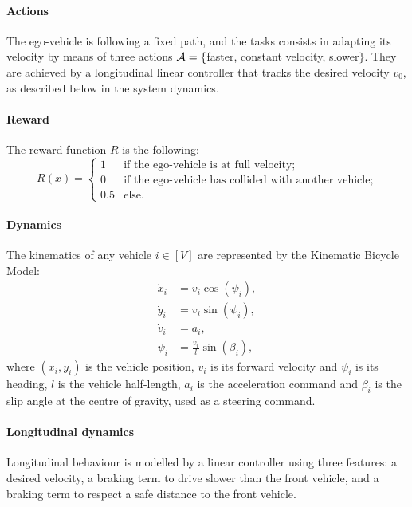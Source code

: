 \documentclass{article}
\begin{document}
\paragraph{Actions}

The ego-vehicle is following a fixed path, and the tasks consists in adapting its velocity by means of three actions $\mathcal{A} = \{$faster, constant velocity, slower$\}$. They are achieved by a longitudinal linear controller that tracks the desired velocity $v_0$, as described below in the system dynamics.

\paragraph{Reward}

The reward function $R$ is the following:
\[
R(x) = 
\begin{cases}
1 & \text{if the ego-vehicle is at full velocity;}\\
0 & \text{if the ego-vehicle has collided with another vehicle;}\\
0.5 & \text{else.}
\end{cases}\]

\paragraph{Dynamics}

The kinematics of any vehicle $i\in[V]$ are represented by the Kinematic Bicycle Model:
\begin{align}
\dot{x}_i &= v_i\cos(\psi_i), \nonumber\\
\dot{y}_i &= v_i\sin(\psi_i), \nonumber\\
\dot{v}_i &= a_i, \nonumber\\
\dot{\psi}_i &= \frac{v_i}{l}\sin(\beta_i), \nonumber
\end{align}
where $(x_i, y_i)$ is the vehicle position, $v_i$ is its forward velocity and $\psi_i$ is its heading, $l$ is the vehicle half-length, $a_i$ is the acceleration command and $\beta_i$ is the slip angle at the centre of gravity, used as a steering command.

\paragraph{Longitudinal dynamics}
Longitudinal behaviour is modelled by a linear controller using three features: a desired velocity, a braking term to drive slower than the front vehicle, and a braking term to respect a safe distance to the front vehicle.
\end{document}
